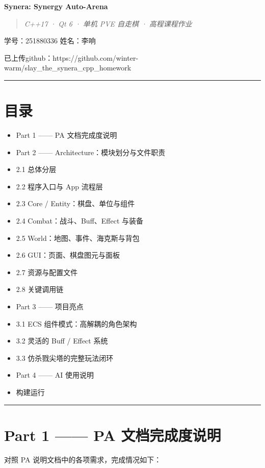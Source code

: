 \documentclass[UTF8,10pt]{ctexart}
\begin{document}
\begin{center}{\Huge\bfseries\color{syneraDark} Synera: Synergy Auto-Arena}\end{center}

\begin{quote}\itshape C++17 · Qt 6 · 单机 PVE 自走棋 · 高程课程作业\end{quote}

学号：251880336
姓名：李响

已上传github：https://github.com/winter-warm/slay\_the\_synera\_cpp\_homework
\par\medskip\hrule\medskip

\section*{目录}

\begin{itemize}
\item Part 1 —— PA 文档完成度说明
\item Part 2 —— Architecture：模块划分与文件职责
\item 2.1 总体分层
\item 2.2 程序入口与 App 流程层
\item 2.3 Core / Entity：棋盘、单位与组件
\item 2.4 Combat：战斗、Buff、Effect 与装备
\item 2.5 World：地图、事件、海克斯与背包
\item 2.6 GUI：页面、棋盘图元与面板
\item 2.7 资源与配置文件
\item 2.8 关键调用链
\item Part 3 —— 项目亮点
\item 3.1 ECS 组件模式：高解耦的角色架构
\item 3.2 灵活的 Buff / Effect 系统
\item 3.3 仿杀戮尖塔的完整玩法闭环
\item Part 4 —— AI 使用说明
\item 构建运行
\end{itemize}

\par\medskip\hrule\medskip

\section*{Part 1 —— PA 文档完成度说明}

对照 PA 说明文档中的各项需求，完成情况如下：
\end{document}
